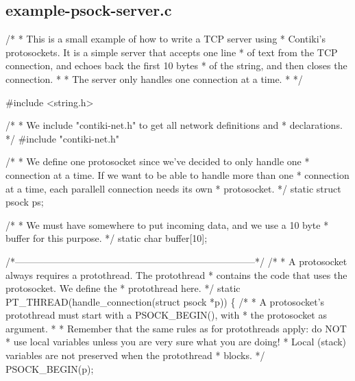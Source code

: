 \hypertarget{a00010}{}\subsection{example-\/psock-\/server.\+c}

\begin{DoxyCodeInclude}
\textcolor{comment}{/*}
\textcolor{comment}{ * This is a small example of how to write a TCP server using}
\textcolor{comment}{ * Contiki's protosockets. It is a simple server that accepts one line}
\textcolor{comment}{ * of text from the TCP connection, and echoes back the first 10 bytes}
\textcolor{comment}{ * of the string, and then closes the connection.}
\textcolor{comment}{ *}
\textcolor{comment}{ * The server only handles one connection at a time.}
\textcolor{comment}{ *}
\textcolor{comment}{ */}

\textcolor{preprocessor}{#include <string.h>}

\textcolor{comment}{/*}
\textcolor{comment}{ * We include "contiki-net.h" to get all network definitions and}
\textcolor{comment}{ * declarations.}
\textcolor{comment}{ */}
\textcolor{preprocessor}{#include "contiki-net.h"}

\textcolor{comment}{/*}
\textcolor{comment}{ * We define one protosocket since we've decided to only handle one}
\textcolor{comment}{ * connection at a time. If we want to be able to handle more than one}
\textcolor{comment}{ * connection at a time, each parallell connection needs its own}
\textcolor{comment}{ * protosocket.}
\textcolor{comment}{ */}
\textcolor{keyword}{static} \textcolor{keyword}{struct }psock ps;

\textcolor{comment}{/*}
\textcolor{comment}{ * We must have somewhere to put incoming data, and we use a 10 byte}
\textcolor{comment}{ * buffer for this purpose.}
\textcolor{comment}{ */}
\textcolor{keyword}{static} \textcolor{keywordtype}{char} buffer[10];

\textcolor{comment}{/*---------------------------------------------------------------------------*/}
\textcolor{comment}{/*}
\textcolor{comment}{ * A protosocket always requires a protothread. The protothread}
\textcolor{comment}{ * contains the code that uses the protosocket. We define the}
\textcolor{comment}{ * protothread here.}
\textcolor{comment}{ */}
\textcolor{keyword}{static}
PT\_THREAD(handle\_connection(\textcolor{keyword}{struct} psock *p))
\{
  \textcolor{comment}{/*}
\textcolor{comment}{   * A protosocket's protothread must start with a PSOCK\_BEGIN(), with}
\textcolor{comment}{   * the protosocket as argument.}
\textcolor{comment}{   *}
\textcolor{comment}{   * Remember that the same rules as for protothreads apply: do NOT}
\textcolor{comment}{   * use local variables unless you are very sure what you are doing!}
\textcolor{comment}{   * Local (stack) variables are not preserved when the protothread}
\textcolor{comment}{   * blocks.}
\textcolor{comment}{   */}
  PSOCK\_BEGIN(p);


\end{DoxyCodeInclude}
